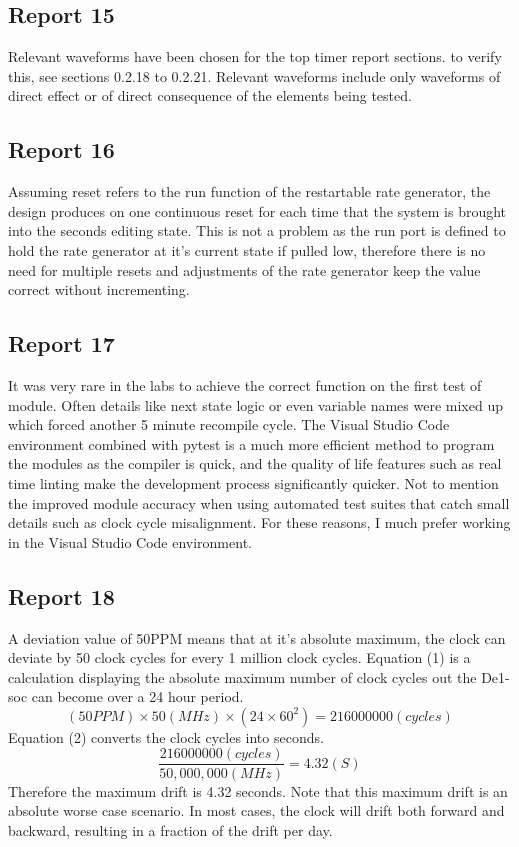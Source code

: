 \documentclass{report}
\begin{document}
\subsection{Report 15}
Relevant waveforms have been chosen for the top timer report sections. 
to verify this, see sections 0.2.18 to 0.2.21. Relevant waveforms 
include only waveforms of direct effect or of direct consequence of the 
elements being tested. 

\subsection{Report 16}
Assuming reset refers to the run function of the restartable rate 
generator, the design produces on one continuous reset for each time 
that the system is brought into the seconds editing state. This is 
not a problem as the run port is defined to hold the rate generator 
at it's current state if pulled low, therefore there is no need for 
multiple resets and adjustments of the rate generator keep the 
value correct without incrementing.

\subsection{Report 17}
It was very rare in the labs to achieve the correct function on the 
first test of module. Often details like next state logic or even 
variable names were mixed up which forced another 5 minute recompile 
cycle. The Visual Studio Code environment combined with pytest is a much 
more efficient method to program the modules as the compiler is quick, 
and the quality of life features such as real time linting make the 
development process significantly quicker. Not to mention the improved 
module accuracy when using automated test suites that catch small 
details such as clock cycle misalignment. For these reasons, I much prefer 
working in the Visual Studio Code environment.

\subsection{Report 18}
A deviation value of 50PPM means that at it's absolute maximum, the 
clock can deviate by 50 clock cycles for every 1 million clock cycles.
Equation (1) is a calculation displaying the absolute maximum number 
of clock cycles out the De1-soc can become over a 24 hour period.
\begin{equation}
  (50PPM) \times 50 (MHz) \times (24 \times 60^2) = 216000000(cycles)
\end{equation}
Equation (2) converts the clock cycles into seconds.
\begin{equation}
  \frac{216000000(cycles)}{50,000,000(MHz)} = 4.32(S)
\end{equation}
Therefore the maximum drift is 4.32 seconds. Note that this maximum 
drift is an absolute worse case scenario. In most cases, the clock 
will drift both forward and backward, resulting in a fraction of the 
drift per day.
\end{document}
